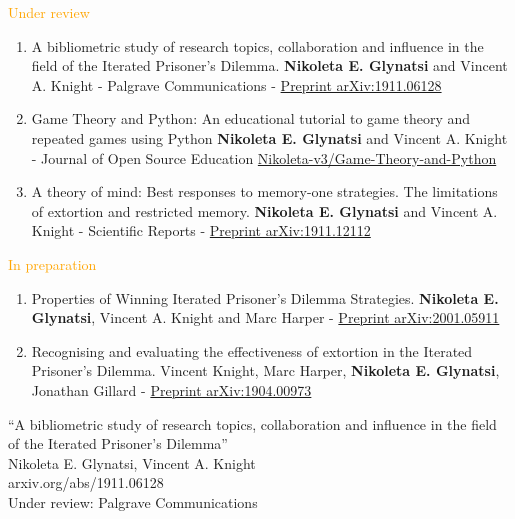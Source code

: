 \documentclass{beamer}
\begin{document}
\begin{frame}
    \footnotesize{\textcolor{orange}{Under review}}
    \tiny{
    \begin{enumerate} \def\labelenumi{\arabic{enumi}.}
        \item A bibliometric study of research topics, collaboration and influence in the field of the Iterated Prisoner's Dilemma.
        \textbf{Nikoleta E. Glynatsi} and Vincent A. Knight -
        Palgrave Communications - \href{https://arxiv.org/abs/1911.12112}{Preprint arXiv:1911.06128}
        \item Game Theory and Python: An educational tutorial to game
        theory and repeated games using Python \textbf{Nikoleta E. Glynatsi} and Vincent A. Knight -
        Journal of Open Source Education
        \href{https://github.com/Nikoleta-v3/Game-Theory-and-Python}{Nikoleta-v3/Game-Theory-and-Python}
        \item A theory of mind: Best responses to memory-one strategies.
        The limitations of extortion and restricted memory. \textbf{Nikoleta E. Glynatsi} and Vincent A. Knight -
        Scientific Reports -
        \href{https://arxiv.org/abs/1911.12112}{Preprint arXiv:1911.12112}
    \end{enumerate}
    }
    
    \footnotesize{\textcolor{orange}{In preparation}}
    \tiny{
    \begin{enumerate} \def\labelenumi{\arabic{enumi}.}
    \item Properties of Winning Iterated Prisoner's Dilemma Strategies. \textbf{Nikoleta E. Glynatsi}, Vincent A. Knight
    and Marc Harper
    - \href{https://arxiv.org/abs/2001.05911}{Preprint arXiv:2001.05911}
    \item Recognising and evaluating the effectiveness of extortion in
    the Iterated Prisoner's Dilemma. Vincent Knight, Marc Harper, \textbf{Nikoleta E. Glynatsi},
    Jonathan Gillard -
    \href{https://arxiv.org/abs/1904.00973}{Preprint arXiv:1904.00973}
    \end{enumerate}
    }
    \end{frame}

\begin{frame}
    \begin{center}
    
    \end{center}
\end{frame}

\begin{frame}
    \begin{center}
        \large{``A bibliometric study of research topics, collaboration and influence in the field of the Iterated Prisoner's Dilemma''} \\ \vspace{.5cm}
        \footnotesize{Nikoleta E. Glynatsi, Vincent A. Knight} \\ \vspace{.5cm}
        \footnotesize{arxiv.org/abs/1911.06128} \\ \vspace{.5cm}
        \footnotesize{Under review: Palgrave Communications}
    \end{center}
\end{frame}
\end{document}
